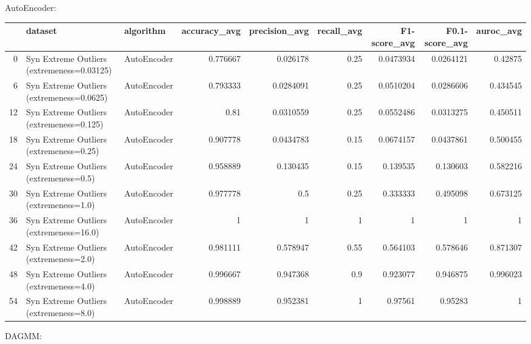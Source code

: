 AutoEncoder:

\begin{tabular}{rllrrrrrr}
\hline
    & dataset                                    & algorithm   &   accuracy\_avg &   precision\_avg &   recall\_avg &   F1-score\_avg &   F0.1-score\_avg &   auroc\_avg \\
\hline
  0 & Syn Extreme Outliers (extremeness=0.03125) & AutoEncoder &       0.776667 &       0.026178  &         0.25 &      0.0473934 &        0.0264121 &    0.42875  \\
  6 & Syn Extreme Outliers (extremeness=0.0625)  & AutoEncoder &       0.793333 &       0.0284091 &         0.25 &      0.0510204 &        0.0286606 &    0.434545 \\
 12 & Syn Extreme Outliers (extremeness=0.125)   & AutoEncoder &       0.81     &       0.0310559 &         0.25 &      0.0552486 &        0.0313275 &    0.450511 \\
 18 & Syn Extreme Outliers (extremeness=0.25)    & AutoEncoder &       0.907778 &       0.0434783 &         0.15 &      0.0674157 &        0.0437861 &    0.500455 \\
 24 & Syn Extreme Outliers (extremeness=0.5)     & AutoEncoder &       0.958889 &       0.130435  &         0.15 &      0.139535  &        0.130603  &    0.582216 \\
 30 & Syn Extreme Outliers (extremeness=1.0)     & AutoEncoder &       0.977778 &       0.5       &         0.25 &      0.333333  &        0.495098  &    0.673125 \\
 36 & Syn Extreme Outliers (extremeness=16.0)    & AutoEncoder &       1        &       1         &         1    &      1         &        1         &    1        \\
 42 & Syn Extreme Outliers (extremeness=2.0)     & AutoEncoder &       0.981111 &       0.578947  &         0.55 &      0.564103  &        0.578646  &    0.871307 \\
 48 & Syn Extreme Outliers (extremeness=4.0)     & AutoEncoder &       0.996667 &       0.947368  &         0.9  &      0.923077  &        0.946875  &    0.996023 \\
 54 & Syn Extreme Outliers (extremeness=8.0)     & AutoEncoder &       0.998889 &       0.952381  &         1    &      0.97561   &        0.95283   &    1        \\
\hline
\end{tabular}

DAGMM:

